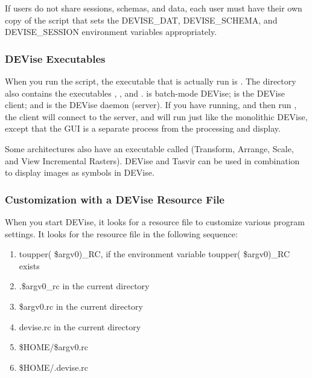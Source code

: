 If users do not share sessions, schemas, and data, each user must have their own copy of
the  script that sets the DEVISE\_DAT, DEVISE\_SCHEMA, and DEVISE\_SESSION
environment variables appropriately.

\subsubsection{DEVise Executables}

When you run the  script, the executable that is actually run is
.  The  directory also contains
the executables , , and .   is
batch-mode DEVise;  is the DEVise client; and  is the
DEVise daemon (server).  If you have  running, and then run ,
the client will connect to the server, and will run just like the monolithic DEVise,
except that the GUI is a separate process from the processing and display.

Some architectures also have an executable called  (Transform, Arrange, Scale,
and View Incremental Rasters).  DEVise and Tasvir can be used in combination to display
images as symbols in DEVise.


\subsubsection{Customization with a DEVise Resource File}


When you start DEVise, it looks for a resource file to customize various
program settings.  It looks for the resource file in the following sequence:

\begin{enumerate}
	\item toupper( \$argv0)\_RC, if the environment variable
		toupper( \$argv0)\_RC exists
	\item .\$argv0\_rc in the current directory
	\item \$argv0.rc in the current directory
	\item devise.rc in the current directory
	\item \$HOME/\$argv0.rc
	\item \$HOME/.devise.rc
\end{enumerate}

